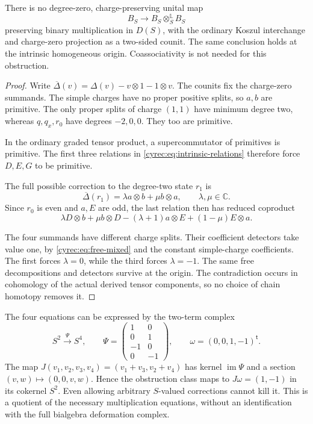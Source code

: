 \begin{theorem}\label{cyrec:thm:hall-obstruction}
There is no degree-zero, charge-preserving unital map
\[
 B_S\longrightarrow B_S\otimes_S^{\mathbb L}B_S
\]
preserving binary multiplication in $D(S)$, with the ordinary
Koszul interchange and charge-zero projection as a two-sided
counit. The same conclusion holds at the intrinsic homogeneous
origin. Coassociativity is not needed for this obstruction.
\end{theorem}

\begin{proof}
Write $\overline\Delta(v)=\Delta(v)-v\otimes1-1\otimes v$.
The counits fix the charge-zero summands. The simple charges
have no proper positive splits, so $a,b$ are primitive.
The only proper splits of charge $(1,1)$ have minimum degree
two, whereas $q,q_x,r_0$ have degrees $-2,0,0$.
They too are primitive.

In the ordinary graded tensor product,
a supercommutator of primitives is primitive.
The first three relations in \eqref{cyrec:eq:intrinsic-relations}
therefore force $D,E,G$ to be primitive.

The full possible correction to the degree-two state $r_1$ is
\[
 \overline\Delta(r_1)=\lambda a\otimes b+\mu b\otimes a,
 \qquad\lambda,\mu\in\mathbb C.
\]
Since $r_0$ is even and $a,E$ are odd, the last relation then
has reduced coproduct
\begin{equation}\label{cyrec:eq:four-defects}
 \lambda D\otimes b+\mu b\otimes D
                -(\lambda+1)a\otimes E+(1-\mu)E\otimes a.
\end{equation}

The four summands have different charge splits. Their coefficient
detectors take value one, by \eqref{cyrec:eq:free-mixed} and
the constant simple-charge coefficients. The first forces
$\lambda=0$, while the third forces $\lambda=-1$.
The same free decompositions and detectors survive at the origin.
The contradiction occurs in cohomology of the actual derived
tensor components, so no choice of chain homotopy removes it.
\end{proof}

The four equations can be expressed by the two-term complex
\begin{equation}\label{cyrec:eq:relative-obstruction}
 S^2\xrightarrow{\Psi}S^4,
 \qquad
 \Psi=\begin{pmatrix}1&0\\0&1\\-1&0\\0&-1\end{pmatrix},
 \qquad\omega=(0,0,1,-1)^{\mathsf t}.
\end{equation}
The map $J(v_1,v_2,v_3,v_4)=(v_1+v_3,v_2+v_4)$ has
kernel $\operatorname{im}\Psi$ and a section
$(v,w)\mapsto(0,0,v,w)$. Hence the obstruction class maps to
$J\omega=(1,-1)$ in its cokernel $S^2$.
Even allowing arbitrary $S$-valued corrections cannot kill it.
This is a quotient of the necessary multiplication equations,
without an identification with the full bialgebra deformation
complex.

